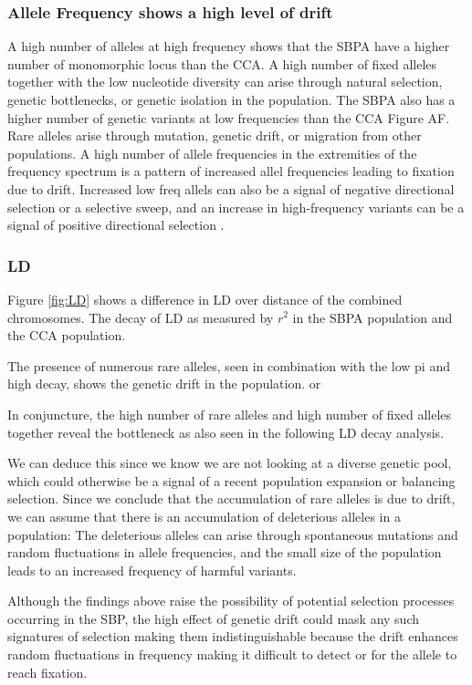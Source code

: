 \documentclass[9pt, twocolumn,twoside]{gsajnl}
\begin{document}
\subsubsection{Allele Frequency shows a high level of drift}
A high number of alleles at high frequency shows that the SBPA have a higher number of monomorphic locus than the CCA. A high number of fixed alleles together with the low nucleotide diversity can arise through natural selection, genetic bottlenecks, or genetic isolation in the population. The SBPA also has a higher number of genetic variants at low frequencies than the CCA Figure AF. Rare alleles arise through mutation, genetic drift, or migration from other populations. A high number of allele frequencies in the extremities of the frequency spectrum is a pattern of increased allel frequencies leading to fixation due to drift. Increased low freq allels can also be a signal of negative directional selection or a selective sweep, and an increase in high-frequency variants can be a signal of positive directional selection \cite{?}. 

\subsubsection{LD}
Figure \ref{fig:LD} shows a difference in LD over distance of the combined chromosomes. The decay of LD as measured by $r^2$ in the SBPA population and the CCA population. 







The presence of numerous rare alleles, seen in combination with the low pi and high decay, shows the genetic drift in the population. 
or

In conjuncture, the high number of rare alleles and high number of fixed alleles together reveal the bottleneck as also seen in the following LD decay analysis. 

We can deduce this since we know we are not looking at a diverse genetic pool, which could otherwise be a signal of a recent population expansion or balancing selection. Since we conclude that the accumulation of rare alleles is due to drift, we can assume that there is an accumulation of deleterious alleles in a population: The deleterious alleles can arise through spontaneous mutations and random fluctuations in allele frequencies, and the small size of the population leads to an increased frequency of harmful variants.

Although the findings above raise the possibility of potential selection processes occurring in the SBP, the high effect of genetic drift could mask any such signatures of selection making them indistinguishable because the drift enhances random fluctuations in  frequency making it difficult to detect or for the allele to reach fixation.
\end{document}
